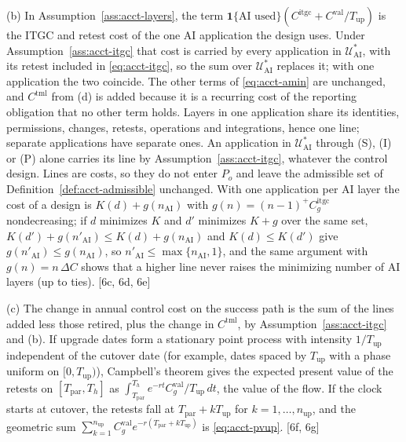 (b) In Assumption~\ref{ass:acct-layers}, the term $\mathbf 1\{\text{AI used}\}(C^{\mathrm{itgc}}+C^{\mathrm{val}}/T_{\mathrm{up}})$ is the ITGC and retest cost of the one AI application the design uses. Under Assumption~\ref{ass:acct-itgc} that cost is carried by every application in $\mathcal U^*_{\mathrm{AI}}$, with its retest included in \eqref{eq:acct-itgc}, so the sum over $\mathcal U^*_{\mathrm{AI}}$ replaces it; with one application the two coincide. The other terms of \eqref{eq:acct-amin} are unchanged, and $C^{\mathrm{tml}}$ from (d) is added because it is a recurring cost of the reporting obligation that no other term holds. Layers in one application share its identities, permissions, changes, retests, operations and integrations, hence one line; separate applications have separate ones. An application in $\mathcal U^*_{\mathrm{AI}}$ through (S), (I) or (P) alone carries its line by Assumption~\ref{ass:acct-itgc}, whatever the control design. Lines are costs, so they do not enter $P_o$ and leave the admissible set of Definition~\ref{def:acct-admissible} unchanged. With one application per AI layer the cost of a design is $K(d)+g(n_{\mathrm{AI}})$ with $g(n)=(n-1)^+C^{\mathrm{itgc}}_g$ nondecreasing; if $d$ minimizes $K$ and $d'$ minimizes $K+g$ over the same set, $K(d')+g(n'_{\mathrm{AI}})\le K(d)+g(n_{\mathrm{AI}})$ and $K(d)\le K(d')$ give $g(n'_{\mathrm{AI}})\le g(n_{\mathrm{AI}})$, so $n'_{\mathrm{AI}}\le\max\{n_{\mathrm{AI}},1\}$, and the same argument with $g(n)=n\,\Delta C$ shows that a higher line never raises the minimizing number of AI layers (up to ties). [6c, 6d, 6e]

(c) The change in annual control cost on the success path is the sum of the lines added less those retired, plus the change in $C^{\mathrm{tml}}$, by Assumption~\ref{ass:acct-itgc} and (b). If upgrade dates form a stationary point process with intensity $1/T_{\mathrm{up}}$ independent of the cutover date (for example, dates spaced by $T_{\mathrm{up}}$ with a phase uniform on $[0,T_{\mathrm{up}})$), Campbell's theorem gives the expected present value of the retests on $[T_{\mathrm{par}},T_h]$ as $\int_{T_{\mathrm{par}}}^{T_h}e^{-rt}C^{\mathrm{val}}_g/T_{\mathrm{up}}\,dt$, the value of the flow. If the clock starts at cutover, the retests fall at $T_{\mathrm{par}}+kT_{\mathrm{up}}$ for $k=1,\dots,n_{\mathrm{up}}$, and the geometric sum $\sum_{k=1}^{n_{\mathrm{up}}}C^{\mathrm{val}}_ge^{-r(T_{\mathrm{par}}+kT_{\mathrm{up}})}$ is \eqref{eq:acct-pvup}. [6f, 6g]

